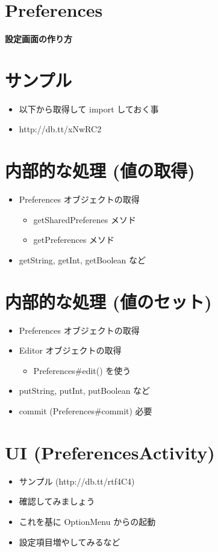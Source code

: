 \documentclass[slide,papersize]{jsarticle}
\begin{document}
\section*{Preferences}
\vspace*{15mm}
\begin{center}
{\Huge {\bf 設定画面の作り方}}
\end{center}

\section*{サンプル}
\bigskip
\begin{itemize}
\item 以下から取得して import しておく事
\bigskip
\item http://db.tt/xNwRC2
\end{itemize}

\section*{内部的な処理 (値の取得)}
\bigskip
\begin{itemize}
\item Preferences オブジェクトの取得
 \begin{itemize}
 \item getSharedPreferenes メソド
 \item getPreferences メソド
 \end{itemize}
\bigskip
\item getString, getInt, getBoolean など
\end{itemize}

\section*{内部的な処理 (値のセット)}
\bigskip
\begin{itemize}
\item Preferences オブジェクトの取得
\bigskip
\item Editor オブジェクトの取得
 \begin{itemize}
 \item Preferences\#edit() を使う
 \end{itemize}
\bigskip
\item putString, putInt, putBoolean など
\bigskip
\item commit (Preferences\#commit) 必要
\end{itemize}

\section*{UI (PreferencesActivity)}
\bigskip
\begin{itemize}
\item サンプル (http://db.tt/rtf4C4)
\medskip
\item 確認してみましょう
\medskip
\item これを基に OptionMenu からの起動
\medskip
\item 設定項目増やしてみるなど
\end{itemize}
\end{document}
